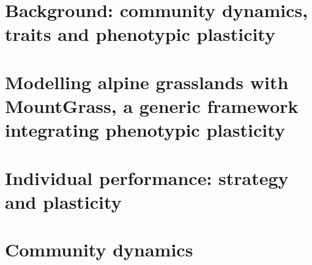 \documentclass[a4paper, notoc, justified,marginals=left, nobib]{tufte-book}
\begin{document}
\part{Background: community dynamics, traits and phenotypic plasticity}
\begin{refsection}
\setcounter{chapter}{0}

\label{literature}

\begin{fullwidth}
\printbibliography[heading=bibliography] 
\end{fullwidth}
\end{refsection}


\part{Modelling alpine grasslands with MountGrass, a generic framework integrating phenotypic plasticity}\label{part:model}
\setcounter{chapter}{0}
\begin{refsection}

%




\begin{fullwidth}
\printbibliography[heading=bibliography] 
\end{fullwidth}
\end{refsection}


\part{Individual performance: strategy and plasticity}\label{part:individuals}

\begin{refsection}
\setcounter{chapter}{0}


\begin{fullwidth}
\printbibliography[heading=bibliography] 
\end{fullwidth}
\end{refsection}

\part{Community dynamics}\label{part:community}
\end{document}
